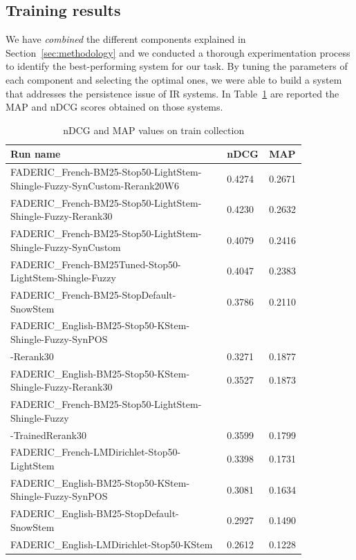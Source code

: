 \subsection{Training results}
\label{subsec:train-res}

We have \emph{combined} the different components explained in Section~\ref{sec:methodology} and we conducted a thorough experimentation process to identify the best-performing system for our task. 
By tuning the parameters of each component and selecting the optimal ones, we were able to build a 
system that addresses the persistence issue of \ac{IR} systems.
In Table~\ref{tab:map-ndcg-table} are reported the \ac{MAP} and \ac{nDCG} scores obtained on those systems.

\begin{table}[tbp]
\caption{\ac{nDCG} and \ac{MAP} values on train collection}
  \label{tab:map-ndcg-table}
    \centering
    \begin{tabular}{|p{0.7\linewidth}|p{0.075\linewidth}|p{0.075\linewidth}|}
	\toprule
	\textbf{Run name} & \textbf{nDCG} & \textbf{MAP} \\
	\midrule
        \raggedright FADERIC\_French-BM25-Stop50-LightStem-Shingle-Fuzzy-SynCustom-Rerank20W6 & 0.4274 & 0.2671 \\ 
        FADERIC\_French-BM25-Stop50-LightStem-Shingle-Fuzzy-Rerank30 & 0.4230 & 0.2632 \\ 
        FADERIC\_French-BM25-Stop50-LightStem-Shingle-Fuzzy-SynCustom & 0.4079 & 0.2416 \\ 
        FADERIC\_French-BM25Tuned-Stop50-LightStem-Shingle-Fuzzy & 0.4047 & 0.2383 \\ 
        FADERIC\_French-BM25-StopDefault-SnowStem & 0.3786 & 0.2110 \\ 
        FADERIC\_English-BM25-Stop50-KStem-Shingle-Fuzzy-SynPOS\\-Rerank30 & 0.3271 & 0.1877 \\ 
        FADERIC\_English-BM25-Stop50-KStem-Shingle-Fuzzy-Rerank30 & 0.3527 & 0.1873 \\ 
        FADERIC\_French-BM25-Stop50-LightStem-Shingle-Fuzzy\\-TrainedRerank30 & 0.3599 & 0.1799 \\ 
        FADERIC\_French-LMDirichlet-Stop50-LightStem & 0.3398 & 0.1731 \\ 
        FADERIC\_English-BM25-Stop50-KStem-Shingle-Fuzzy-SynPOS & 0.3081 & 0.1634 \\ 
        FADERIC\_English-BM25-StopDefault-SnowStem & 0.2927 & 0.1490 \\ 
        FADERIC\_English-LMDirichlet-Stop50-KStem & 0.2612 & 0.1228 \\ 
	\bottomrule
    \end{tabular}
\end{table}

